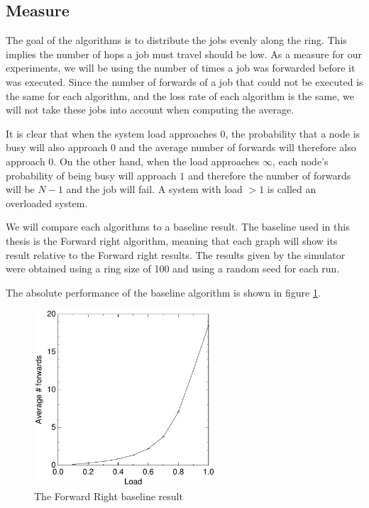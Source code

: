 \documentclass[10pt,a4paper,titlepage]{article}
\begin{document}
\subsection{Measure}
The goal of the algorithms is to distribute the jobs evenly along the ring. This implies the number of hops a job must travel should be low. As a measure for our experiments, we will be using the number of times a job was forwarded before it was executed. Since the number of forwards of a job that could not be executed is the same for each algorithm, and the loss rate of each algorithm is the same, we will not take these jobs into account when computing the average.

It is clear that when the system load approaches $0$, the probability that a node is busy will also approach $0$ and the average number of forwards will therefore also approach $0$. On the other hand, when the load approaches $\infty$, each node's probability of being busy will approach $1$ and therefore the number of forwards will be $N-1$ and the job will fail. A system with load $> 1$ is called an overloaded system.

We will compare each algorithms to a baseline result. The baseline used in this thesis is the Forward right algorithm, meaning that each graph will show its result relative to the Forward right results. The results given by the simulator were obtained using a ring size of 100 and using a random seed for each run.

The absolute performance of the baseline algorithm is shown in figure \ref{baseline}.

\begin{figure}[h!tb]
\centering
\includegraphics[width=0.6\textwidth]{data/right.pdf}
\caption{The Forward Right baseline result}
\label{baseline}
\end{figure}
\end{document}
